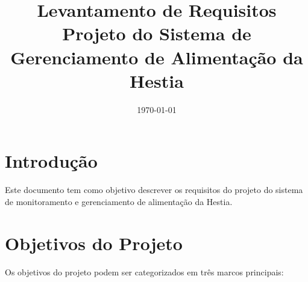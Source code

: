 \documentclass[12pt]{article}
\title{Levantamento de Requisitos\\Projeto do Sistema de Gerenciamento de Alimentação da Hestia}
\date{\today}
\begin{document}
\maketitle

\tableofcontents
\newpage

\section{Introdução}

Este documento tem como objetivo descrever os requisitos do projeto do sistema de monitoramento e gerenciamento de alimentação da Hestia.

\section{Objetivos do Projeto}

Os objetivos do projeto podem ser categorizados em três marcos principais:
\end{document}
